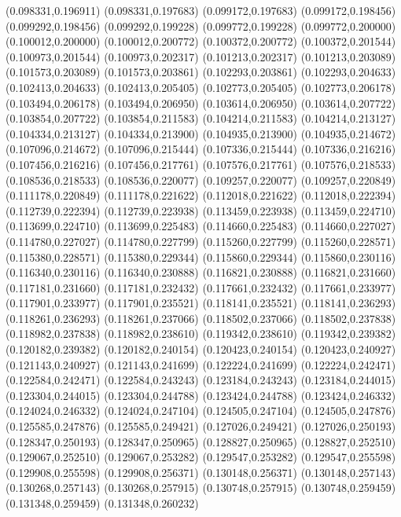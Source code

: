 (0.098331,0.196911)
(0.098331,0.197683)
(0.099172,0.197683)
(0.099172,0.198456)
(0.099292,0.198456)
(0.099292,0.199228)
(0.099772,0.199228)
(0.099772,0.200000)
(0.100012,0.200000)
(0.100012,0.200772)
(0.100372,0.200772)
(0.100372,0.201544)
(0.100973,0.201544)
(0.100973,0.202317)
(0.101213,0.202317)
(0.101213,0.203089)
(0.101573,0.203089)
(0.101573,0.203861)
(0.102293,0.203861)
(0.102293,0.204633)
(0.102413,0.204633)
(0.102413,0.205405)
(0.102773,0.205405)
(0.102773,0.206178)
(0.103494,0.206178)
(0.103494,0.206950)
(0.103614,0.206950)
(0.103614,0.207722)
(0.103854,0.207722)
(0.103854,0.211583)
(0.104214,0.211583)
(0.104214,0.213127)
(0.104334,0.213127)
(0.104334,0.213900)
(0.104935,0.213900)
(0.104935,0.214672)
(0.107096,0.214672)
(0.107096,0.215444)
(0.107336,0.215444)
(0.107336,0.216216)
(0.107456,0.216216)
(0.107456,0.217761)
(0.107576,0.217761)
(0.107576,0.218533)
(0.108536,0.218533)
(0.108536,0.220077)
(0.109257,0.220077)
(0.109257,0.220849)
(0.111178,0.220849)
(0.111178,0.221622)
(0.112018,0.221622)
(0.112018,0.222394)
(0.112739,0.222394)
(0.112739,0.223938)
(0.113459,0.223938)
(0.113459,0.224710)
(0.113699,0.224710)
(0.113699,0.225483)
(0.114660,0.225483)
(0.114660,0.227027)
(0.114780,0.227027)
(0.114780,0.227799)
(0.115260,0.227799)
(0.115260,0.228571)
(0.115380,0.228571)
(0.115380,0.229344)
(0.115860,0.229344)
(0.115860,0.230116)
(0.116340,0.230116)
(0.116340,0.230888)
(0.116821,0.230888)
(0.116821,0.231660)
(0.117181,0.231660)
(0.117181,0.232432)
(0.117661,0.232432)
(0.117661,0.233977)
(0.117901,0.233977)
(0.117901,0.235521)
(0.118141,0.235521)
(0.118141,0.236293)
(0.118261,0.236293)
(0.118261,0.237066)
(0.118502,0.237066)
(0.118502,0.237838)
(0.118982,0.237838)
(0.118982,0.238610)
(0.119342,0.238610)
(0.119342,0.239382)
(0.120182,0.239382)
(0.120182,0.240154)
(0.120423,0.240154)
(0.120423,0.240927)
(0.121143,0.240927)
(0.121143,0.241699)
(0.122224,0.241699)
(0.122224,0.242471)
(0.122584,0.242471)
(0.122584,0.243243)
(0.123184,0.243243)
(0.123184,0.244015)
(0.123304,0.244015)
(0.123304,0.244788)
(0.123424,0.244788)
(0.123424,0.246332)
(0.124024,0.246332)
(0.124024,0.247104)
(0.124505,0.247104)
(0.124505,0.247876)
(0.125585,0.247876)
(0.125585,0.249421)
(0.127026,0.249421)
(0.127026,0.250193)
(0.128347,0.250193)
(0.128347,0.250965)
(0.128827,0.250965)
(0.128827,0.252510)
(0.129067,0.252510)
(0.129067,0.253282)
(0.129547,0.253282)
(0.129547,0.255598)
(0.129908,0.255598)
(0.129908,0.256371)
(0.130148,0.256371)
(0.130148,0.257143)
(0.130268,0.257143)
(0.130268,0.257915)
(0.130748,0.257915)
(0.130748,0.259459)
(0.131348,0.259459)
(0.131348,0.260232)
